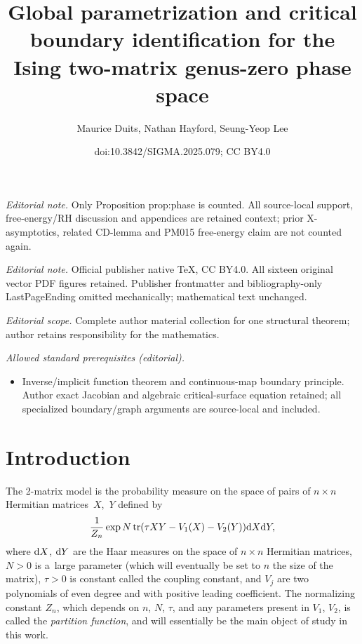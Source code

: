 \documentclass[10pt,a4paper]{amsart}
\title{Global parametrization and critical boundary identification for the Ising two-matrix genus-zero phase space}
\author{Maurice Duits, Nathan Hayford, Seung-Yeop Lee}
\date{doi:10.3842/SIGMA.2025.079; CC BY4.0}
\DeclareMathOperator{\tr}{tr}
\numberwithin{equation}{section}
\begin{document}
\maketitle
\noindent\textit{Editorial note.} Only Proposition prop:phase is counted. All source-local support, free-energy/RH discussion and appendices are retained context; prior X-asymptotics, related CD-lemma and PM015 free-energy claim are not counted again.\par\medskip
\noindent\textit{Editorial note.} Official publisher native TeX, CC BY4.0. All sixteen original vector PDF figures retained. Publisher frontmatter and bibliography-only LastPageEnding omitted mechanically; mathematical text unchanged.\par\medskip
\noindent\textit{Editorial scope.} Complete author material collection for one structural theorem; author retains responsibility for the mathematics.\par\medskip
\noindent\textit{Allowed standard prerequisites (editorial).}\begin{itemize}
\item Inverse/implicit function theorem and continuous-map boundary principle. Author exact Jacobian and algebraic critical-surface equation retained; all specialized boundary/graph arguments are source-local and included.
\end{itemize}\medskip
\section{Introduction}

The 2-matrix model is the probability measure on the space of pairs of $n \times n$ Hermitian matrices~$X$,~$Y$ defined by
\begin{equation} \label{eq:twomatrixmodel}
 \frac{1}{Z_{n}} \exp N \tr (\tau X Y- V_1(X) -V_2(Y) ) {\rm d}X {\rm d}Y,
\end{equation}
where ${\rm d}X$, ${\rm d}Y$ are the Haar measures on the space of $n\times n$ Hermitian matrices, $N>0$ is a~large parameter (which will eventually be set to $n$ the size of the matrix), $\tau>0$ is constant called the coupling constant, and $V_j$ are two polynomials of even degree and with positive leading coefficient. The normalizing constant $Z_{n}$, which depends on $n$, $N$, $\tau$, and any parameters present in $V_1$, $V_2$, is called the \textit{partition function}, and will essentially be the main object of study in this work.
\end{document}
